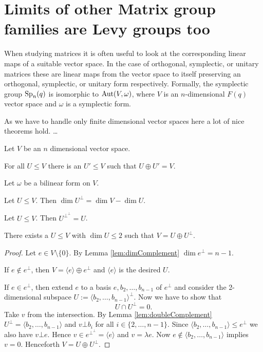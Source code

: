 
\section{Limits of other Matrix group families are Levy groups too}
When studying matrices it is often useful to look at the corresponding linear maps of a suitable vector space. In the case of orthogonal, symplectic, or unitary matrices these are linear maps from the vector space to itself preserving an orthogonal, symplectic, or unitary form respectively. Formally, the symplectic group $\operatorname{Sp}_n(q)$ is isomorphic to $\operatorname{Aut}(V,\omega)$, where $V$ is an $n$-dimensional $F(q)$ vector space and $\omega$ is a symplectic form.

As we have to handle only finite dimensional vector spaces here a lot of nice theorems hold. \dots

Let $V$ be an $n$ dimensional vector space.%
\begin{lemma}\label{lem:complementExists}
For all $U\leq V$ there is an $U'\leq V$ such that $U\oplus U'=V$.
\end{lemma}


Let $\omega$ be a bilinear form on $V$.

\begin{lemma}\label{lem:dimComplement}
Let $U\leq V$. Then $\dim U^\bot= \dim V-\dim U$.
\end{lemma}
\begin{lemma}\label{lem:doubleComplement}
Let $U\leq V$. Then $U^{\bot^\bot}=U$.
\end{lemma}

\begin{lemma}\label{lem:decompositionComplement}
There exists a $U\leq V$ with $\dim U\leq 2$ such that $V=U\oplus U^\bot$.
\end{lemma}
\begin{proof}
Let $e\in V\setminus\{0\}$. By Lemma \ref{lem:dimComplement} $\dim e^\bot= n-1$. %

If $e\notin e^\bot$, then $V=\langle e\rangle\oplus e^\bot$ and $\langle e\rangle$ is the desired $U$.

If $e\in e^\bot$, then extend $e$ to a basis $e,b_2,\dots,b_{n-1}$ of $e^\bot$ and consider the 2-dimensional subspace $U:=\langle b_2,\dots,b_{n-1}\rangle^\bot$. Now we have to show that \[U\cap U^\bot=0.\]
Take $v$ from the intersection. By Lemma \ref{lem:doubleComplement} $U^\bot=\langle b_2,\dots,b_{n-1}\rangle$ and $v\bot b_i$ for all $i\in\{2,\dots,n-1\}$. Since $\langle b_2,\dots,b_{n-1}\rangle\leq e^\bot$ we also have $v\bot e$. Hence $v\in e^{\bot^\bot}=\langle e\rangle$ and $v=\lambda e$. Now $e\notin \langle b_2,\dots,b_{n-1}\rangle$ implies $v=0$. Henceforth $V=U\oplus U^\bot$.
\end{proof}


